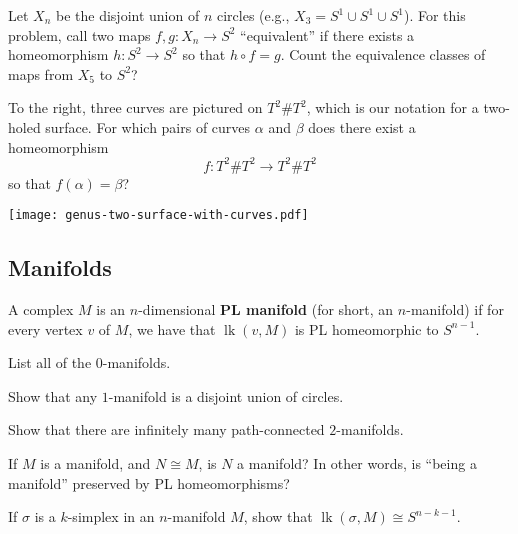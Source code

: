 \documentclass[12pt]{pset}
\DeclareMathOperator{\lk}{lk}
\begin{document}
\begin{problem}
  Let $X_n$ be the disjoint union of $n$ circles (e.g., $X_3 = S^1
  \cup S^1 \cup S^1$).  For this problem, call two maps $f, g : X_n
  \to S^2$ ``equivalent'' if there exists a homeomorphism $h : S^2 \to
  S^2$ so that $h \circ f = g$.  Count the equivalence classes of maps
  from $X_5$ to $S^2$?
\end{problem}

\noindent\parbox{0.50\textwidth}{%
\begin{problem}
To the right, three curves are pictured on $T^2 \# T^2$, which is our
notation for a two-holed surface.  For which pairs of curves $\alpha$ and $\beta$ does there exist a homeomorphism $$f : T^2 \# T^2 \to T^2 \# T^2$$ so that $f(\alpha) = \beta$?
\end{problem}}%
\hspace{5pt}%
\parbox{0.50\textwidth}{%
\texttt{[image: genus-two-surface-with-curves.pdf]}%
}


\subsection*{Manifolds}

\begin{definition*}
  A complex $M$ is an $n$-dimensional \textbf{PL manifold} (for short,
an $n$-manifold) if for every vertex $v$ of $M$, we have that
$\lk(v,M)$ is PL homeomorphic to $S^{n-1}$.
\end{definition*}

\begin{problem}
  List all of the $0$-manifolds.
\end{problem}
\begin{requiredproblem}
 Show that any $1$-manifold is a disjoint union of circles.
\end{requiredproblem}
\begin{problem}
  Show that there are infinitely many path-connected $2$-manifolds.
\end{problem}
\begin{requiredproblem}
  If $M$ is a manifold, and $N \cong M$, is $N$ a manifold?  In other
  words, is ``being a manifold'' preserved by PL homeomorphisms?
\end{requiredproblem}

\begin{problem}
If $\sigma$ is a $k$-simplex in an $n$-manifold $M$, show that
$\lk(\sigma,M) \cong S^{n - k - 1}$.
\end{problem}
\end{document}
